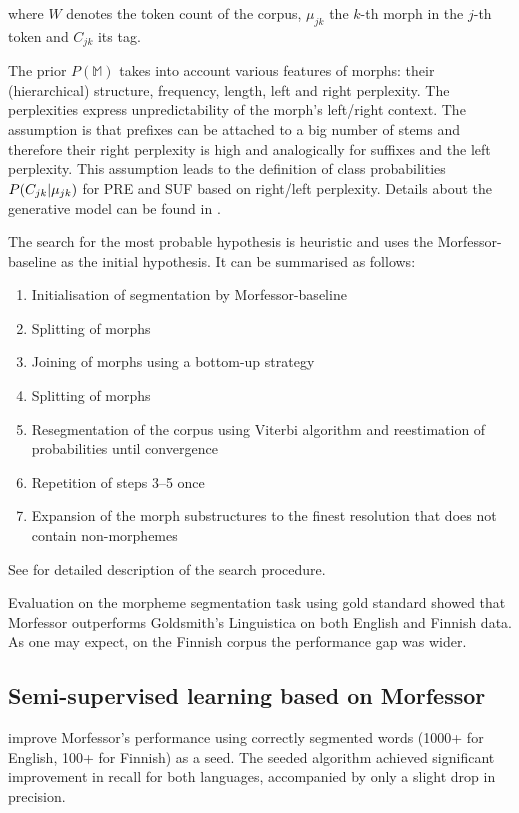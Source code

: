 where $W$ denotes the token count of the corpus, $\mu_{jk}$ the $k$-th morph in the $j$-th token and $C_{jk}$ its tag.

The prior $P(\mathbb{M})$ takes into account various features of morphs: their (hierarchical) structure, frequency, length, left and right perplexity. The perplexities express unpredictability of the morph's left/right context. The assumption is that prefixes can be attached to a big number of stems and therefore their right perplexity is high and analogically for suffixes and the left perplexity. This assumption leads to the definition of class probabilities $P(C_{jk} | \mu_{jk})$ for PRE and SUF based on right/left perplexity. Details about the generative model can be found in \cite[pp. 9--16]{creutz07}.

The search for the most probable hypothesis is heuristic and uses the Morfessor-baseli\-ne as the initial hypothesis. It can be summarised as follows:
\begin{enumerate}
\item Initialisation of segmentation by Morfessor-baseline
\item Splitting of morphs
\item Joining of morphs using a bottom-up strategy
\item Splitting of morphs
\item Resegmentation of the corpus using Viterbi algorithm and reestimation of probabilities until convergence
\item Repetition of steps 3–5 once
\item Expansion of the morph substructures to the finest resolution that does not contain non-morphemes
\end{enumerate}
See \cite{creutz-lagus-2005} for detailed description of the search procedure.

Evaluation on the morpheme segmentation task using gold standard showed that Morfessor outperforms Goldsmith's Linguistica on both English and Finnish data. As one may expect, on the Finnish corpus the performance gap was wider.

\subsection{Semi-supervised learning based on Morfessor}\label{section:semisup_morfessor}

\cite{kohonen-etal-2010} improve Morfessor's performance using correctly segmented words (1000+ for English, 100+ for Finnish) as a seed. The seeded algorithm achieved significant improvement in recall for both languages, accompanied by only a slight drop in precision.

